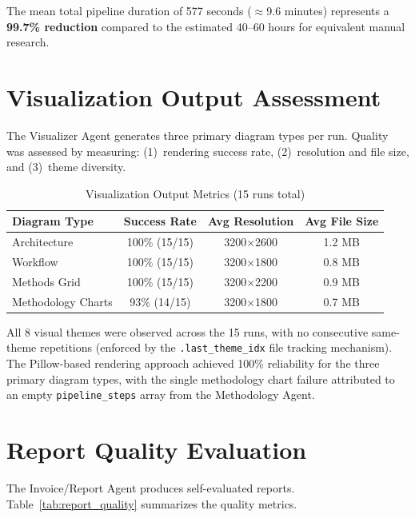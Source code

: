 The mean total pipeline duration of 577 seconds ($\approx$9.6 minutes) represents a \textbf{99.7\% reduction} compared to the estimated 40--60 hours for equivalent manual research.

\section{Visualization Output Assessment}

The Visualizer Agent generates three primary diagram types per run. Quality was assessed by measuring: (1)~rendering success rate, (2)~resolution and file size, and (3)~theme diversity.

\begin{table}[H]
\centering
\caption{Visualization Output Metrics (15 runs total)}
\label{tab:viz_metrics}
\begin{tabularx}{\textwidth}{|l|c|c|c|}
\hline
\textbf{Diagram Type} & \textbf{Success Rate} & \textbf{Avg Resolution} & \textbf{Avg File Size} \\
\hline
Architecture & 100\% (15/15) & 3200$\times$2600 & 1.2 MB \\
\hline
Workflow & 100\% (15/15) & 3200$\times$1800 & 0.8 MB \\
\hline
Methods Grid & 100\% (15/15) & 3200$\times$2200 & 0.9 MB \\
\hline
Methodology Charts & 93\% (14/15) & 3200$\times$1800 & 0.7 MB \\
\hline
\end{tabularx}
\end{table}

All 8 visual themes were observed across the 15 runs, with no consecutive same-theme repetitions (enforced by the \texttt{.last\_theme\_idx} file tracking mechanism). The Pillow-based rendering approach achieved 100\% reliability for the three primary diagram types, with the single methodology chart failure attributed to an empty \texttt{pipeline\_steps} array from the Methodology Agent.

\section{Report Quality Evaluation}

The Invoice/Report Agent produces self-evaluated reports. Table~\ref{tab:report_quality} summarizes the quality metrics.

